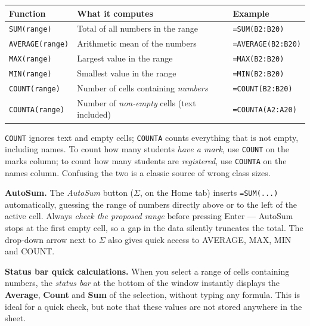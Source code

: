\documentclass[11pt]{article}
\begin{document}
\begin{center}
\begin{tabularx}{\linewidth}{|l|X|l|}
\hline
\rowcolor{popblueL} \textbf{Function} & \textbf{What it computes} & \textbf{Example} \\
\hline
\texttt{SUM(range)} & Total of all numbers in the range & \texttt{=SUM(B2:B20)} \\
\hline
\texttt{AVERAGE(range)} & Arithmetic mean of the numbers & \texttt{=AVERAGE(B2:B20)} \\
\hline
\texttt{MAX(range)} & Largest value in the range & \texttt{=MAX(B2:B20)} \\
\hline
\texttt{MIN(range)} & Smallest value in the range & \texttt{=MIN(B2:B20)} \\
\hline
\texttt{COUNT(range)} & Number of cells containing \emph{numbers} & \texttt{=COUNT(B2:B20)} \\
\hline
\texttt{COUNTA(range)} & Number of \emph{non-empty} cells (text included) & \texttt{=COUNTA(A2:A20)} \\
\hline
\end{tabularx}
\end{center}

\begin{attention}
\texttt{COUNT} ignores text and empty cells; \texttt{COUNTA} counts everything that is not empty, including names. To count how many students \emph{have a mark}, use \texttt{COUNT} on the marks column; to count how many students are \emph{registered}, use \texttt{COUNTA} on the names column. Confusing the two is a classic source of wrong class sizes.
\end{attention}

\textbf{AutoSum.} The \emph{AutoSum} button ($\Sigma$, on the Home tab) inserts \texttt{=SUM(...)} automatically, guessing the range of numbers directly above or to the left of the active cell. Always \emph{check the proposed range} before pressing Enter --- AutoSum stops at the first empty cell, so a gap in the data silently truncates the total. The drop-down arrow next to $\Sigma$ also gives quick access to AVERAGE, MAX, MIN and COUNT.

\textbf{Status bar quick calculations.} When you select a range of cells containing numbers, the \emph{status bar} at the bottom of the window instantly displays the \textbf{Average}, \textbf{Count} and \textbf{Sum} of the selection, without typing any formula. This is ideal for a quick check, but note that these values are not stored anywhere in the sheet.
\end{document}
